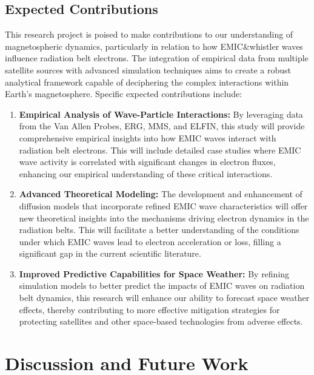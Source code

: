 \documentclass[
  letterpaper,
  DIV=11,
  numbers=noendperiod]{scrartcl}
\begin{document}
\subsection{Expected Contributions}\label{expected-contributions}

This research project is poised to make contributions to our understanding of magnetospheric dynamics, particularly in relation to how EMIC\&whistler waves influence radiation belt electrons. The integration of empirical data from multiple satellite sources with advanced simulation techniques aims to create a robust analytical framework capable of deciphering the complex interactions within Earth's magnetosphere. Specific expected contributions include:

\begin{enumerate}
\def\labelenumi{\arabic{enumi}.}
\item
  \textbf{Empirical Analysis of Wave-Particle Interactions:} By leveraging data from the Van Allen Probes, ERG, MMS, and ELFIN, this study will provide comprehensive empirical insights into how EMIC waves interact with radiation belt electrons. This will include detailed case studies where EMIC wave activity is correlated with significant changes in electron fluxes, enhancing our empirical understanding of these critical interactions.
\item
  \textbf{Advanced Theoretical Modeling:} The development and enhancement of diffusion models that incorporate refined EMIC wave characteristics will offer new theoretical insights into the mechanisms driving electron dynamics in the radiation belts. This will facilitate a better understanding of the conditions under which EMIC waves lead to electron acceleration or loss, filling a significant gap in the current scientific literature.
\item
  \textbf{Improved Predictive Capabilities for Space Weather:} By refining simulation models to better predict the impacts of EMIC waves on radiation belt dynamics, this research will enhance our ability to forecast space weather effects, thereby contributing to more effective mitigation strategies for protecting satellites and other space-based technologies from adverse effects.
\end{enumerate}

\section{Discussion and Future Work}\label{discussion-and-future-work}
\end{document}
